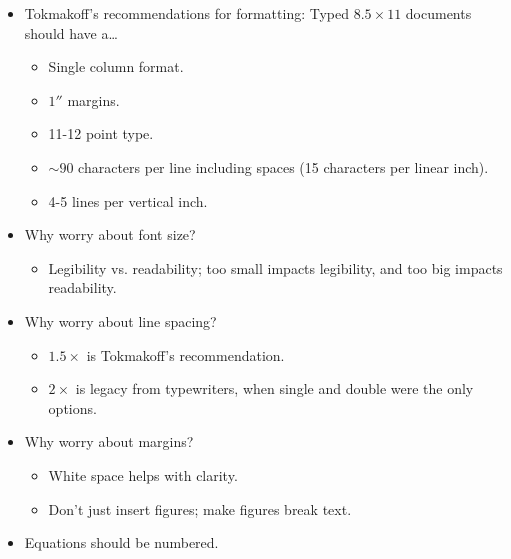 \documentclass[../notes.tex]{subfiles}
\begin{document}
\begin{itemize}
    \begin{itemize}
        \item Times New Roman and Garamond have full math support.
        \item Computer modern (\TeX) is probably still the best in terms of being able to distinguish things since it includes so many helpful flourishes.
        \begin{itemize}
            \item You're probably encountered difficulties with the lab manual (e.g., $v$ vs. $\nu$) because it's not in Computer modern.
        \end{itemize}
    \end{itemize}
    \item Tokmakoff's recommendations for formatting: Typed $8.5\times 11$ documents should have a\dots
    \begin{itemize}
        \item Single column format.
        \item $1''$ margins.
        \item 11-12 point type.
        \item $\sim 90$ characters per line including spaces (15 characters per linear inch).
        \item 4-5 lines per vertical inch.
    \end{itemize}
    \item Why worry about font size?
    \begin{itemize}
        \item Legibility vs. readability; too small impacts legibility, and too big impacts readability.
    \end{itemize}
    \item Why worry about line spacing?
    \begin{itemize}
        \item $1.5\times$ is Tokmakoff's recommendation.
        \item $2\times$ is legacy from typewriters, when single and double were the only options.
    \end{itemize}
    \item Why worry about margins?
    \begin{itemize}
        \item White space helps with clarity.
        \item Don't just insert figures; make figures break text.
    \end{itemize}
    \item Equations should be numbered.

\end{itemize}
\end{document}
